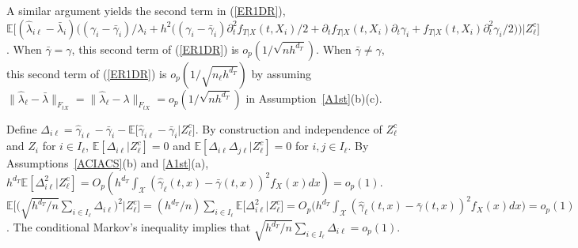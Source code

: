 \documentclass[lettersize, 12pt]{article}
\begin{document}
A similar argument yields the second term in (\ref{ER1DR}), 
$\mathbb{E}\Big[
(\hat\lambda_{i\ell} - \bar{\lambda}_i)
\Big((\gamma_i - \bar{\gamma}_i)/\lambda_i
+ h^2
\big((\gamma_i - \bar{\gamma}_i) \partial_t^2 f_{T|X}(t, X_i)/2 +  \partial_t f_{T|X}(t, X_i) \partial_t \gamma_i
+ f_{T|X}(t,X_i) \partial_t^2 \gamma_i/2
\big)\Big)\Big|Z_\ell^c\Big]$.
When $\bar{\gamma} = \gamma$, this second term of (\ref{ER1DR}) is $o_p(1/\sqrt{n h^{d_T}})$.
When $\bar{\gamma} \neq \gamma$, 
this second term of (\ref{ER1DR}) is $o_p(1/\sqrt{n_\ell h^{d_T}})$ by assuming $\|\hat\lambda_{\ell} - \bar{\lambda}\|_{F_{tX}} = \|\hat\lambda_{\ell} - {\lambda}\|_{F_{tX}} = o_p(1/\sqrt{n h^{d_T}})$ in Assumption~\ref{A1st}(b)(c).





Define $\Delta_{i\ell} = \hat \gamma_{i\ell} - \bar \gamma_i - \mathbb{E}\big[\hat \gamma_{i\ell} - \bar \gamma_i |Z_\ell^c\big]$.
By construction and independence of $Z_\ell^c$ and $Z_i$ for $i\in I_\ell$, $\mathbb{E}[\Delta_{i\ell}|Z_\ell^c] = 0$ and $\mathbb{E}[\Delta_{i\ell}\Delta_{j\ell}|Z_\ell^c] = 0$ for $i,j \in I_\ell$.
By Assumptions~\ref{ACIACS}(b) and \ref{A1st}(a),
$h^{d_T}\mathbb{E}[\Delta_{i\ell}^2|Z_\ell^c] = O_p( h^{d_T} \int_\mathcal{X} (\hat \gamma_{\ell}(t,x) - \bar \gamma(t,x))^2 f_X(x)dx) = o_p(1)$.
$\mathbb{E}\big[\big(\sqrt{h^{d_T}/n} \sum_{i\in I_\ell} \Delta_{i\ell}\big)^2 \big|Z_\ell^c\big]
= 
(h^{d_T}/n) \sum_{i\in I_\ell} \mathbb{E}\big[ \Delta_{i\ell}^2 \big|Z_\ell^c\big]
=
O_p\big(h^{d_T} \int_\mathcal{X} (\hat \gamma_{\ell}(t,x) - \bar \gamma(t,x))^2 f_X(x)dx\big)  
=
o_p(1)$.
The conditional Markov's inequality implies that $\sqrt{h^{d_T}/n} \sum_{i\in I_\ell}  \Delta_{i\ell} =o_p(1)$.
\end{document}
